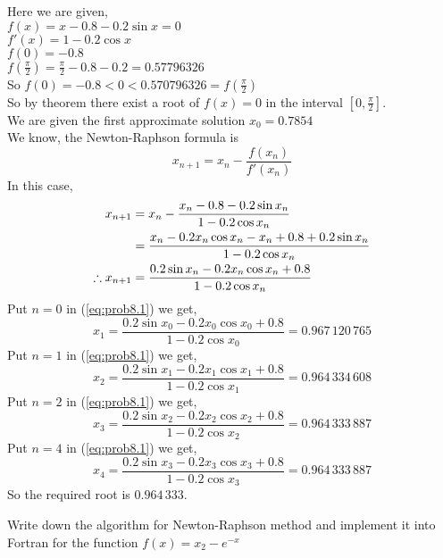 \documentclass[12pt,class=book,crop=false]{standalone}
\begin{document}
\begin{soln}
    Here we are given,\\
    \indent \( f(x)=x-0.8-0.2\sin x=0 \)\\
    \indent \( f'(x)=1-0.2\cos x \)\\
    \indent \( f(0)=-0.8\)\\
    \indent \(f\left(\frac{\pi}{2}\right)=\frac{\pi}{2}-0.8-0.2=0.57796326 \)\\
    So \( f(0)=-0.8<0<0.570796326=f\left(\frac{\pi}{2}\right)\)\\
    So by theorem there exist a root of \( f(x)=0 \) in the interval \( \left[0,\frac{\pi}{2}\right] \).\\
    We are given the first approximate solution \( x_0=0.7854 \)\\
    We know, the Newton-Raphson formula is
    \[
        x_{n+1}=x_n-\frac{f(x_n)}{f'(x_n)}
    \]
    In this case,
    \begin{align}
        x_{n+1}            & =x_n-\frac{x_n-0.8-0.2\sin x_n}{1-0.2\cos x_n}\notag                     \\
                           & =\frac{x_n-0.2x_n\cos x_n-x_n+0.8+0.2\sin x_n}{1-0.2\cos x_n}\notag      \\
        \therefore x_{n+1} & =\frac{0.2\sin x_n-0.2 x_n\cos x_n+0.8}{1-0.2\cos x_n}\label{eq:prob8.1}
    \end{align}
    Put \( n=0 \) in (\ref{eq:prob8.1}) we get,
    \[
        x_{1} =\frac{0.2\sin x_0-0.2 x_0\cos x_0+0.8}{1-0.2\cos x_0}=0.967\,120\,765
    \]
    Put \( n=1 \) in (\ref{eq:prob8.1}) we get,
    \[
        x_{2} =\frac{0.2\sin x_1-0.2 x_1\cos x_1+0.8}{1-0.2\cos x_1}=0.964\,334\,608
    \]
    Put \( n=2 \) in (\ref{eq:prob8.1}) we get,
    \[
        x_{3}=\frac{0.2\sin x_2-0.2 x_2\cos x_2+0.8}{1-0.2\cos x_2}=0.964\,333\,887
    \]
    Put \( n=4 \) in (\ref{eq:prob8.1}) we get,
    \[
        x_{4} =\frac{0.2\sin x_3-0.2 x_3\cos x_3+0.8}{1-0.2\cos x_3}=0.964\,333\,887
    \]
    So the required root is \( 0.964\,333 \).
\end{soln}
\begin{prob}
    Write down the algorithm for Newton-Raphson method and implement it into Fortran for the function \( f(x)=x_2-e^{-x} \)
\end{prob}
\end{document}
